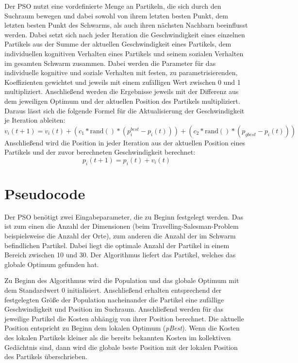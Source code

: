 Der PSO nutzt eine vordefinierte Menge an Partikeln, die sich durch den
Suchraum bewegen und dabei sowohl von ihrem letzten besten Punkt, dem letzten
besten Punkt des Schwarms, als auch ihren nächsten Nachbarn beeinflusst werden.
Dabei setzt sich nach jeder Iteration die Geschwindigkeit eines einzelnen
Partikels aus der Summe der aktuellen Geschwindigkeit eines Partikels, dem
individuellen kognitiven Verhalten eines Partikels und seinem sozialen
Verhalten im gesamten Schwarm zusammen. Dabei werden die Parameter für das
individuelle kognitive und soziale Verhalten mit festen, zu parametrisierenden,
Koeffizienten gewichtet und jeweils mit einem zufälligen Wert zwischen 0 und 1
multipliziert. Anschließend werden die Ergebnisse jeweils mit der Differenz
aus dem jeweiligen Optimum und der aktuellen Position des Partikels
multipliziert. Daraus lässt sich die folgende Formel für die Aktualisierung
der Geschwindigkeit je Iteration ableiten:
\begin{equation}
    v_i(t+1) = v_i(t) + (c_1 * \mathrm{rand()} * (p_{i}^{best} - p_i(t))) + (c_2 * \mathrm{rand()} * (p_{gbest} - p_i(t)))
\end{equation}
Anschließend wird die Position in jeder Iteration aus der aktuellen Position
eines Partikels und der zuvor berechneten Geschwindigkeit berechnet:
\begin{equation}
    p_i(t+1) = p_i(t) + v_i(t)
\end{equation}

\section{Pseudocode}

Der PSO benötigt zwei Eingabeparameter, die zu Beginn festgelegt werden. Das
ist zum einen die Anzahl der Dimensionen (beim Travelling-Salesman-Problem
beispielsweise die Anzahl der Orte), zum anderen die Anzahl der im Schwarm
befindlichen Partikel. Dabei liegt die optimale Anzahl der Partikel in einem
Bereich zwischen 10 und 30. Der Algorithmus liefert das Partikel, welches das
globale Optimum gefunden hat.

Zu Beginn des Algorithmus wird die Population und das globale Optimum mit dem
Standardwert 0 initialisiert. Anschließend erhalten entsprechend der
festgelegten Größe der Population nacheinander die Partikel eine zufällige
Geschwindigkeit und Position im Suchraum. Anschließend werden für das jeweilige
Partikel die Kosten abhängig von ihrer Position berechnet. Die aktuelle
Position entspricht zu Beginn dem lokalen Optimum (\emph{pBest}). Wenn die
Kosten des lokalen Partikels kleiner als die bereits bekannten Kosten im
kollektiven Gedächtnis sind, dann wird die globale beste Position mit der
lokalen Position des Partikels überschrieben.

